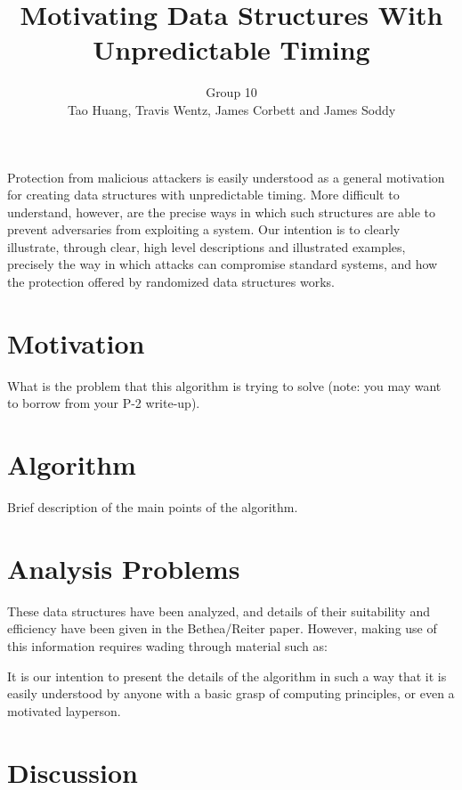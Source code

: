 \documentclass[11pt,twocolumn]{article}
\title{Motivating Data Structures With Unpredictable Timing}
\author{Group 10\\
\small{Tao Huang, Travis Wentz, James Corbett and James Soddy}}
\begin{document}
\maketitle

Protection from malicious attackers is easily understood as a general motivation
for creating data structures with unpredictable timing. More difficult to understand,
however, are the precise ways in which such structures are able to prevent adversaries
from exploiting a system. Our intention is to clearly illustrate, through clear,
high level descriptions and illustrated examples, precisely the way in which attacks
can compromise standard systems, and how the protection offered by randomized
data structures works.

\section{Motivation}
What is the problem that this algorithm is trying to solve (note: you may want 
to borrow from your P-2 write-up).

\section{Algorithm}
Brief description of the main points of the algorithm.

\section{Analysis Problems}
These data structures have been analyzed, and details of their suitability and
efficiency have been given in the Bethea/Reiter paper\cite{Bethea09}. However,
making use of this information requires wading through material such as:


It is our intention to present the details of the algorithm in such a way that
it is easily understood by anyone with a basic grasp of computing principles,
or even a motivated layperson.


\section{Discussion}
\end{document}
